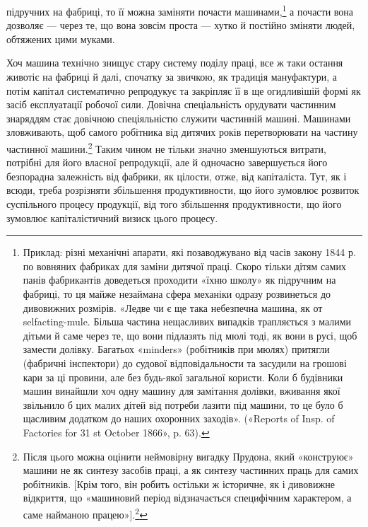 \parcont{}  %
підручних на фабриці, то її можна заміняти почасти машинами,\footnote{
Приклад: різні механічні апарати, які позаводжувано від часів
закону 1844 р. по вовняних фабриках для заміни дитячої праці. Скоро
тільки дітям самих панів фабрикантів доведеться проходити «їхню школу»
як підручним на фабриці, то ця майже незаймана сфера механіки одразу
розвинеться до дивовижних розмірів. «Ледве чи є ще така небезпечна
машина, як от selfacting-mule. Більша частина нещасливих випадків
трапляється з малими дітьми й саме через те, що вони підлазять під мюлі
тоді, як вони в русі, щоб замести долівку. Багатьох «minders» (робітників
при мюлях) притягли (фабричні інспектори) до судової відповідальности
та засудили на грошові кари за ці провини, але без будь-якої загальної
користи. Коли б будівники машин винайшли хоч одну машину
для замітання долівки, вживання якої звільнило б цих малих дітей від
потреби лазити під машини, то це було б щасливим додатком до наших
охоронних заходів». («Reports of Insp. of Factories for 31 st October
1866», p. 63).
}
а почасти вона дозволяє — через те, що вона зовсім проста —
хутко й постійно зміняти людей, обтяжених цими муками.

Хоч машина технічно знищує стару систему поділу праці,
все ж таки остання животіє на фабриці й далі, спочатку за звичкою,
як традиція мануфактури, а потім капітал систематично
репродукує та закріпляє її в ще огидливішій формі як засіб
експлуатації робочої сили. Довічна спеціальність орудувати
частинним знаряддям стає довічною спеціяльністю служити частинній
машині. Машинами зловживають, щоб самого робітника
від дитячих років перетворювати на частину частинної машини.\footnote{
Після цього можна оцінити неймовірну вигадку Прудона, який
«конструює» машини не як синтезу засобів праці, а як синтезу частинних
праць для самих робітників. [Крім того, він робить остільки ж історичне,
як і дивовижне відкриття, що «машиновий період відзначається специфічним
характером, а саме найманою працею»].\footnote*{
Подане у прямих дужках ми беремо з французького видання. \emph{Ред.}
}
}
Таким чином не тільки значно зменшуються витрати, потрібні
для його власної репродукції, але й одночасно завершується його
безпорадна залежність від фабрики, як цілости, отже, від капіталіста.
Тут, як і всюди, треба розрізняти збільшення продуктивности,
що його зумовлює розвиток суспільного процесу продукції,
від того збільшення продуктивности, що його зумовлює
капіталістичний визиск цього процесу.

